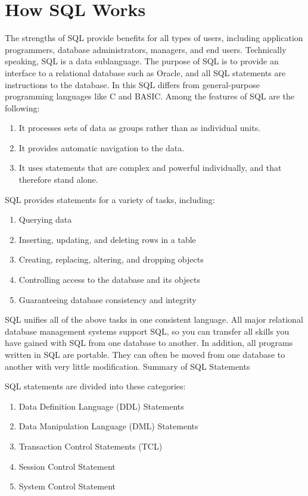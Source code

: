 \documentclass[10pt,a4paper,titlepage]{report}
\begin{document}
{\section{How SQL Works}

The strengths of SQL provide benefits for all types of users, including application programmers, database administrators, managers, and end users. Technically speaking, SQL is a data sublanguage. The purpose of SQL is to provide an interface to a relational database such as Oracle, and all SQL statements are instructions to the database. In this SQL differs from general-purpose programming languages like C and BASIC. Among the features of SQL are the following:
\begin{enumerate}
	\item It processes sets of data as groups rather than as individual units.
	\item It provides automatic navigation to the data.
	\item It uses statements that are complex and powerful individually, and that therefore stand alone.
\end{enumerate}

SQL provides statements for a variety of tasks, including:
\begin{enumerate}
	\item Querying data
	\item Inserting, updating, and deleting rows in a table
	\item Creating, replacing, altering, and dropping objects
	\item Controlling access to the database and its objects
	\item Guaranteeing database consistency and integrity
\end{enumerate}

SQL unifies all of the above tasks in one consistent language. All major relational database management systems support SQL, so you can transfer all skills you have gained with SQL from one database to another. In addition, all programs written in SQL are portable. They can often be moved from one database to another with very little modification. Summary of SQL Statements

SQL statements are divided into these categories:
\begin{enumerate}
	\item Data Definition Language (DDL) Statements
	\item Data Manipulation Language (DML) Statements
	\item Transaction Control Statements (TCL)
	\item Session Control Statement
	\item System Control Statement
\end{enumerate}

}
\end{document}
